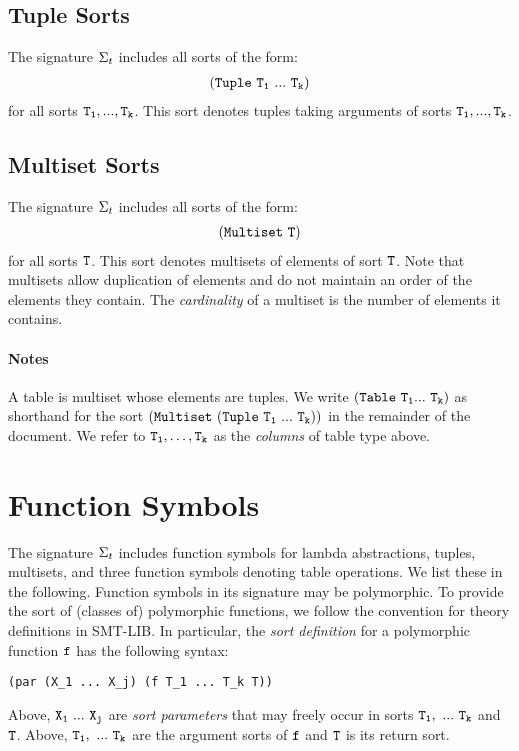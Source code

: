 \documentclass[english,a4paper,10pt]{article}
\begin{document}
\subsection{Tuple Sorts}

The signature $\Sigma_{t}$ includes all sorts of the form:
\begin{align*}
{\tt  (Tuple\ T_1\ ...\ T_k) }
\end{align*}
for all sorts ${\tt T_1, ..., T_k}$.
This sort denotes tuples taking arguments of sorts ${\tt T_1, ..., T_k}$.

\subsection{Multiset Sorts}
The signature $\Sigma_{t}$ includes all sorts of the form:
\begin{align*}
{\tt  (Multiset\ T) }
\end{align*}
for all sorts ${\tt T}$. 
This sort denotes multisets of elements of sort ${\tt T}$.
Note that multisets allow duplication of elements and do not maintain an order
of the elements they contain.
The \emph{cardinality} of a multiset is the number of elements it contains.

\paragraph{Notes}
A table is multiset whose elements are tuples.
We write ${\tt  (Table\ T_1 ...\ T_k)}$ as shorthand for 
the sort $\syntax{ (Multiset\ (Tuple\ T_1\ ...\ T_k)) }$ 
in the remainder of the document.
We refer to ${\tt T_1}, \ldots, {\tt T_k}$ as the \emph{columns} of table type above.

\section{Function Symbols}

The signature $\Sigma_{t}$ includes function symbols for
lambda abstractions,
tuples, multisets, and
three function symbols denoting table operations.
We list these in the following.
Function symbols in its signature may be polymorphic.
To provide the sort of (classes of) polymorphic functions,
we follow the convention for theory definitions in SMT-LIB. %
In particular, the \emph{sort definition} for a polymorphic function ${\tt f}$
has the following syntax:
\begin{verbatim}
(par (X_1 ... X_j) (f T_1 ... T_k T))
\end{verbatim}
Above, ${\tt X_1\ ...\ X_j}$ are \emph{sort parameters}
that may freely occur in sorts ${\tt T_1,\ ...\ T_k}$ and ${\tt T}$.
Above, ${\tt T_1,\ ...\ T_k}$ are the argument sorts of ${\tt f}$
and ${\tt T}$ is its return sort.
\end{document}
